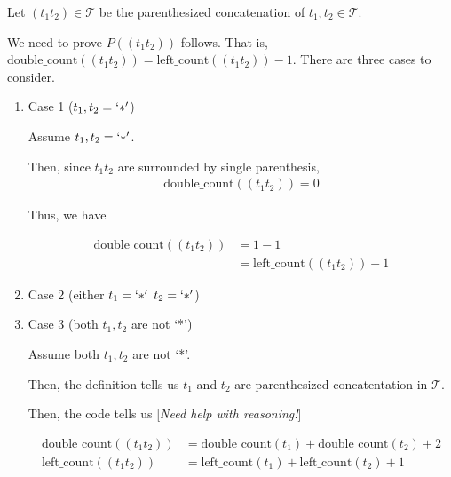 \documentclass[12pt]{article}
\begin{document}
\begin{enumerate}[a.]
\begin{mdframed}
\begin{enumerate}[1.]
\begin{mdframed}
        Let $(t_1t_2) \in \mathcal{T}$ be the parenthesized concatenation of $t_1,t_2 \in \mathcal{T}$.

        \bigskip

        We need to prove $P((t_1t_2))$ follows. That is, $\text{double\_count}((t_1t_2)) = \text{left\_count}((t_1t_2)) - 1$.
        There are three cases to consider.

        \bigskip

        \begin{enumerate}[1.]
            \item Case 1 ($t_1,t_2 = `*'$)

            \begin{mdframed}
            Assume $t_1,t_2 = `*'$.

            \bigskip

            Then, since $t_1t_2$ are surrounded by single parenthesis,
            \setcounter{equation}{0}
            \begin{align}
                \text{double\_count}((t_1t_2)) = 0
            \end{align}

            \bigskip

            Thus, we have

            \begin{align}
                \text{double\_count}((t_1t_2)) &= 1 - 1\\
                &= \text{left\_count}((t_1t_2)) - 1
            \end{align}
            \end{mdframed}

            \item Case 2 (either $t_1 = `*'$ $t_2 = `*'$)

            \item Case 3 (both $t_1,t_2$ are not `*')

            \begin{mdframed}
            Assume both $t_1,t_2$ are not `*'.

            \bigskip

            Then, the definition tells us $t_1$ and $t_2$ are
            parenthesized concatentation in $\mathcal{T}$.

            \bigskip

            Then, the code tells us [\textit{Need help with reasoning!}]

            \begin{align}
                \text{double\_count}((t_1t_2)) &= \text{double\_count}(t_1) + \text{double\_count}(t_2) + 2\\
                \text{left\_count}((t_1t_2)) &= \text{left\_count}(t_1) + \text{left\_count}(t_2) + 1
            \end{align}


\end{mdframed}
\end{enumerate}
\end{mdframed}
\end{enumerate}
\end{mdframed}
\end{enumerate}
\end{document}
